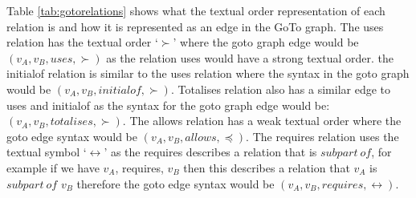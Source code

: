 Table \ref{tab:gotorelations} shows what the textual order representation of each
relation is and how it is represented as an edge in the GoTo graph. The uses
relation has the textual order `$\succ$' where the goto graph edge would be
$(v_{A}, v_{B}, uses, \succ)$ as the relation uses would have a strong textual
order. the initialof relation is similar to the uses relation where the syntax
in the goto graph would be $(v_{A}, v_{B}, initialof, \succ)$. Totalises
relation also has a similar edge to uses and initialof as the syntax for the
goto graph edge would be: $(v_{A}, v_{B}, totalises, \succ)$. The allows
relation has a weak textual order where the goto edge syntax would be $(v_{A},
v_{B}, allows, \preceq)$. The requires relation uses the textual symbol
`$\leftrightarrow$' as the requires describes a relation that is $subpart\ of$,
for example if we have $v_{A}$, requires, $v_{B}$ then this describes a relation
that $v_{A}$ is $subpart\ of$ $v_{B}$ therefore the goto edge syntax would be
$(v_{A}, v_{B}, requires, \leftrightarrow)$.

